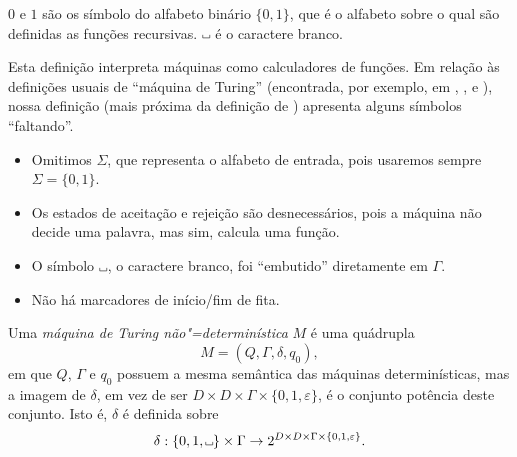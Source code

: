 $0$ e $1$ são os símbolo do alfabeto binário $\{0, 1\}$,
que é o alfabeto sobre o qual são definidas as funções recursivas.
$\B$ é o caractere branco.

Esta definição interpreta máquinas como calculadores de funções.
Em relação às definições usuais de ``máquina de Turing''
(encontrada, por exemplo,
em \cite[p.~148]{HopcroftUllman1979},
\cite[p.~140]{Sipser2006},
e \cite[p.~6]{Kozen2006}),
nossa definição
(mais próxima da definição de )
apresenta alguns símbolos ``faltando''.
\begin{itemize}
    \setlength{\labelsep}{1ex}
    \item Omitimos $\Sigma$, que representa o alfabeto de entrada,
        pois usaremos sempre $\Sigma = \{0, 1\}$.
    \item Os estados de aceitação e rejeição são desnecessários,
        pois a máquina não decide uma palavra,
        mas sim, calcula uma função.
    \item O símbolo $\B$, o caractere branco,
        foi ``embutido'' diretamente em $\Gamma$.
    \item Não há marcadores de início/fim de fita.
\end{itemize}

\begin{definition}
    Uma \emph{máquina de Turing não"=determinística} $M$ é uma quádrupla
    \begin{equation*}
        M = (Q, \Gamma, \delta, q_0),
    \end{equation*}
    em que $Q$, $\Gamma$ e $q_0$ possuem a mesma semântica
    das máquinas determinísticas,
    mas a imagem de $\delta$,
    em vez de ser $D \times D \times \Gamma \times \{0, 1, \varepsilon\}$,
    é o conjunto potência deste conjunto.
    Isto é, $\delta$ é definida sobre
    \begin{equation*}
        \delta: \{0, 1, \B\} \times \Gamma
            \to 2^{D \times D \times \Gamma \times \{0, 1, \varepsilon\}}.
    \end{equation*}
\end{definition}
